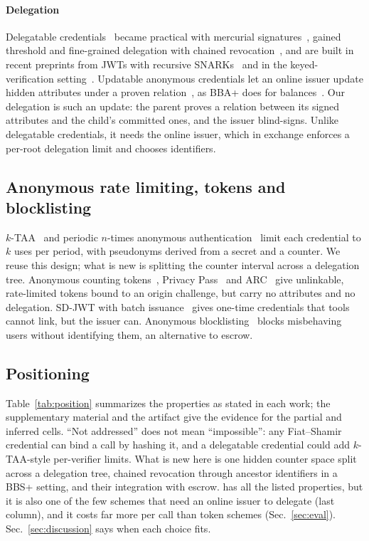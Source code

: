 \paragraph*{Delegation} Delegatable credentials~\cite{belenkiy2009dac,camenisch2017cdd} became practical with mercurial signatures~\cite{griffy2024dac}, gained threshold and fine-grained delegation with chained revocation~\cite{mir2024tdac,xie2025fdaac}, and are built in recent preprints from JWTs with recursive SNARKs~\cite{rometsch2026dac} and in the keyed-verification setting~\cite{mirzamohammadi2026dkvac}. Updatable anonymous credentials let an online issuer update hidden attributes under a proven relation~\cite{blomer2019uacs}, as BBA+ does for balances~\cite{hartung2017bbaplus}. Our delegation is such an update: the parent proves a relation between its signed attributes and the child's committed ones, and the issuer blind-signs. Unlike delegatable credentials, it needs the online issuer, which in exchange enforces a per-root delegation limit and chooses identifiers.

\subsection{Anonymous rate limiting, tokens and blocklisting}
$k$-TAA~\cite{teranishi2004ktaa,au2006bbsplus} and periodic $n$-times anonymous authentication~\cite{camenisch2006clonewars} limit each credential to $k$ uses per period, with pseudonyms derived from a secret and a counter. We reuse this design; what is new is splitting the counter interval across a delegation tree. Anonymous counting tokens~\cite{benhamouda2023act}, Privacy Pass~\cite{rfc9576,rfc9577,rfc9578,hanff2025privacypass} and ARC~\cite{yun2026arccrypto} give unlinkable, rate-limited tokens bound to an origin challenge, but carry no attributes and no delegation. SD-JWT with batch issuance~\cite{rfc9901,openid4vci} gives one-time credentials that tools cannot link, but the issuer can. Anonymous blocklisting~\cite{tsang2011nymble,tsang2007blac,rosenberg2022snarkblock} blocks misbehaving users without identifying them, an alternative to escrow.

\subsection{Positioning}
Table~\ref{tab:position} summarizes the properties as stated in each work; the supplementary material and the artifact give the evidence for the partial and inferred cells. ``Not addressed'' does not mean ``impossible'': any Fiat--Shamir credential can bind a call by hashing it, and a delegatable credential could add $k$-TAA-style per-verifier limits. What is new here is one hidden counter space split across a delegation tree, chained revocation through ancestor identifiers in a BBS+ setting, and their integration with escrow. \sys{} has all the listed properties, but it is also one of the few schemes that need an online issuer to delegate (last column), and it costs far more per call than token schemes (Sec.~\ref{sec:eval}). Sec.~\ref{sec:discussion} says when each choice fits.


